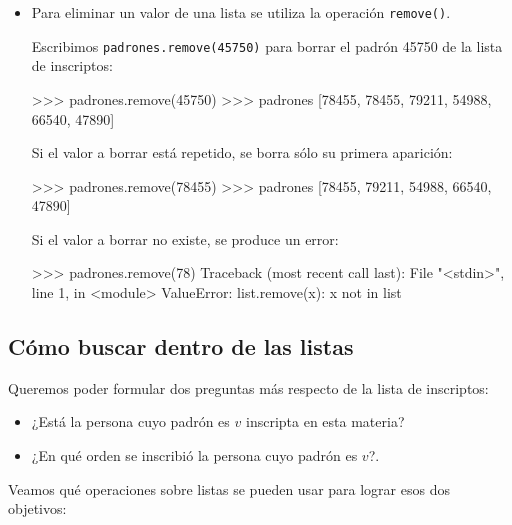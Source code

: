 \begin{itemize}
\item Para eliminar un valor de una lista se utiliza la operación
\lstinline+remove()+.

Escribimos \lstinline+padrones.remove(45750)+ para borrar el padrón 45750 de la
lista de inscriptos:

\begin{codigo-python-sn}
>>> padrones.remove(45750)
>>> padrones
[78455, 78455, 79211, 54988, 66540, 47890]
\end{codigo-python-sn}

Si el valor a borrar está repetido, se borra sólo su primera aparición:

\begin{codigo-python-sn}
>>> padrones.remove(78455)
>>> padrones
[78455, 79211, 54988, 66540, 47890]
\end{codigo-python-sn}

\begin{atencion}
Si el valor a borrar no existe, se produce un error:

\begin{codigo-python-sn}
>>> padrones.remove(78)
Traceback (most recent call last):
  File "<stdin>", line 1, in <module>
ValueError: list.remove(x): x not in list
\end{codigo-python-sn}
\end{atencion}
\end{itemize}

\subsection{Cómo buscar dentro de las listas}

Queremos poder formular dos preguntas más respecto de la lista de
inscriptos:

\begin{itemize}
\item ¿Está la persona cuyo padrón es $v$ inscripta en esta materia?

\item ¿En qué orden se inscribió la persona cuyo padrón es $v$?.
\end{itemize}

Veamos qué operaciones sobre listas se pueden usar para lograr esos dos
objetivos:

